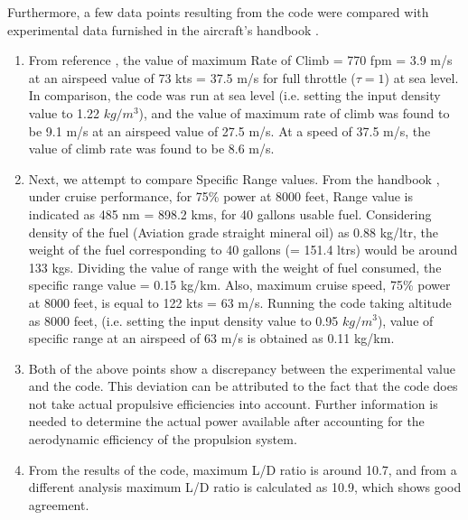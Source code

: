 \documentclass[letterpaper,12pt]{article}
\begin{document}
Furthermore, a few data points resulting from the code were compared with experimental data furnished in the aircraft's handbook \cite{cessna}. 
\begin{enumerate}
\item From reference \cite{cessna}, the value of maximum Rate of Climb = 770 fpm = 3.9 m/s at an airspeed value of 73 kts = 37.5 m/s for full throttle ($\tau=1$) at sea level. In comparison, the code was run at sea level (i.e. setting the input density value to 1.22 $kg/m^3$), and the value of maximum rate of climb was found to be 9.1 m/s at an airspeed value of 27.5 m/s. At a speed of 37.5 m/s, the value of climb rate was found to be 8.6 m/s.

\item Next, we attempt to compare Specific Range values. From the handbook \cite{cessna}, under cruise performance, for 75\% power at 8000 feet, Range value is indicated as 485 nm = 898.2 kms, for 40 gallons usable fuel. Considering density of the fuel (Aviation grade straight mineral oil) as 0.88 kg/ltr, the weight of the fuel corresponding to 40 gallons (= 151.4 ltrs) would be around 133 kgs. Dividing the value of range with the weight of fuel consumed, the specific range value = 0.15 kg/km. Also, maximum cruise speed, 75\% power at 8000 feet, is equal to 122 kts = 63 m/s. Running the code taking altitude as 8000 feet, (i.e. setting the input density value to 0.95 $kg/m^3$), value of specific range at an airspeed of 63 m/s is obtained as 0.11 kg/km.

\item Both of the above points show a discrepancy between the experimental value and the code. This deviation can be attributed to the fact that the code does not take actual propulsive efficiencies into account. Further information is needed to determine the actual power available after accounting for the aerodynamic efficiency of the propulsion system.

\item From the results of the code, maximum L/D ratio is around 10.7, and from a different analysis \cite{cessna2} maximum L/D ratio is calculated as 10.9, which shows good agreement.
\end{enumerate}
\end{document}
